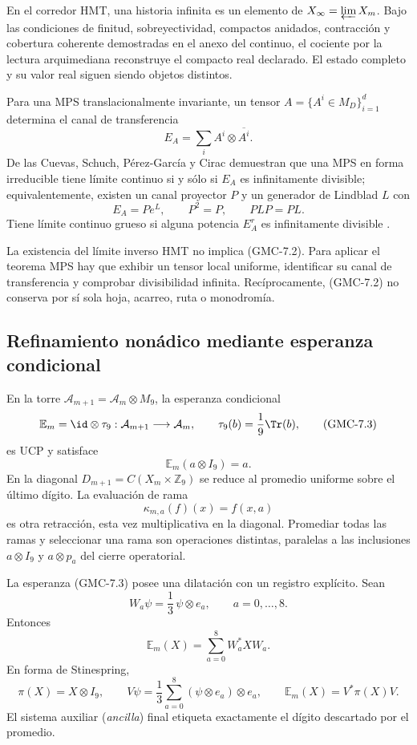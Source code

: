 En el corredor HMT, una historia infinita es un elemento de
$X_\infty=\varprojlim X_m$. Bajo las condiciones de finitud, sobreyectividad,
compactos anidados, contracción y cobertura coherente demostradas en el
anexo del continuo, el cociente por la lectura arquimediana reconstruye el
compacto real declarado. El estado completo y su valor real siguen siendo
objetos distintos.

Para una MPS translacionalmente invariante, un tensor
$A=\{A^i\in M_D\}_{i=1}^d$ determina el canal de transferencia
\[
 E_A=\sum_i A^i\otimes\overline{A^i}.
 \tag{GMC-7.1}
\]
De las Cuevas, Schuch, Pérez-García y Cirac demuestran que una MPS en forma
irreducible tiene límite continuo si y sólo si $E_A$ es infinitamente
divisible; equivalentemente, existen un canal proyector $P$ y un generador
de Lindblad $L$ con
\[
 E_A=Pe^L,
 \qquad P^2=P,
 \qquad PLP=PL.
 \tag{GMC-7.2}
\]
Tiene límite continuo grueso si alguna potencia $E_A^r$ es infinitamente
divisible \citep{delascuevas2018continuum}.

\begin{controlbox}
La existencia del límite inverso HMT no implica \textup{(GMC-7.2)}. Para aplicar el
teorema MPS hay que exhibir un tensor local uniforme, identificar su canal de
transferencia y comprobar divisibilidad infinita. Recíprocamente,
\textup{(GMC-7.2)} no conserva por sí sola hoja, acarreo, ruta o monodromía.
\end{controlbox}
\fi

\ifdefined\HMTGMCOperatorialTower
\subsection{Refinamiento nonádico mediante esperanza condicional}
\label{p12-83-c22-s7:gmc:sec:refinamiento-condicional}

En la torre
$\mathcal A_{m+1}=\mathcal A_m\otimes M_9$, la esperanza condicional
\[
 \mathbb E_m=\id\otimes\tau_9:
 \mathcal A_{m+1}\longrightarrow\mathcal A_m,
 \qquad \tau_9(b)=\frac1{9}\Tr(b),
 \tag{GMC-7.3}
\]
es UCP y satisface
\[
 \mathbb E_m(a\otimes I_9)=a.
 \tag{GMC-7.4}
\]
En la diagonal $D_{m+1}=C(X_m\times\mathbb Z_9)$ se reduce al promedio
uniforme sobre el último dígito. La evaluación de rama
\[
 \kappa_{m,a}(f)(x)=f(x,a)
 \tag{GMC-7.5}
\]
es otra retracción, esta vez multiplicativa en la diagonal. Promediar todas
las ramas y seleccionar una rama son operaciones distintas, paralelas a las
inclusiones $a\otimes I_9$ y $a\otimes p_a$ del cierre operatorial.

La esperanza \textup{(GMC-7.3)} posee una dilatación con un registro explícito. Sean
\[
 W_a\psi=\frac13\,\psi\otimes e_a,
 \qquad a=0,\ldots,8.
 \]
Entonces
\[
 \mathbb E_m(X)=\sum_{a=0}^8W_a^*XW_a.
 \tag{GMC-7.6}
\]
En forma de Stinespring,
\[
 \pi(X)=X\otimes I_9,
 \qquad
 V\psi=\frac13\sum_{a=0}^8(\psi\otimes e_a)\otimes e_a,
 \qquad
 \mathbb E_m(X)=V^*\pi(X)V.
 \tag{GMC-7.7}
\]
El sistema auxiliar (\emph{ancilla}) final etiqueta exactamente el dígito descartado por el promedio.

